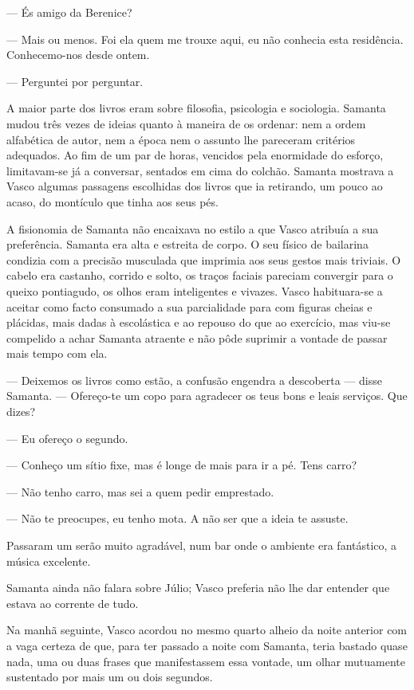--- És amigo da Berenice?

--- Mais ou menos. Foi ela quem me trouxe aqui, eu não conhecia esta
  residência. Conhecemo-nos desde ontem.

--- Perguntei por perguntar.

A maior parte dos livros eram sobre filosofia, psicologia e sociologia.
Samanta mudou três vezes de ideias quanto à maneira de os ordenar: nem
a ordem alfabética de autor, nem a época nem o assunto lhe pareceram
critérios adequados. Ao fim de um par de horas, vencidos pela enormidade
do esforço, limitavam-se já a conversar, sentados em cima do colchão.
Samanta mostrava a Vasco algumas passagens escolhidas dos livros que ia
retirando, um pouco ao acaso, do montículo que tinha aos seus pés.

A fisionomia de Samanta não encaixava no estilo a que Vasco atribuía a
sua preferência. Samanta era alta e estreita de corpo. O seu físico de
bailarina condizia com a precisão musculada que imprimia aos seus
gestos mais triviais. O cabelo era castanho, corrido e solto, os traços
faciais pareciam convergir para o queixo pontiagudo, os olhos eram
inteligentes e vivazes. Vasco habituara-se a aceitar como facto
consumado a sua parcialidade para com figuras cheias e plácidas, mais
dadas à escolástica e ao repouso do que ao exercício, mas viu-se compelido a achar Samanta atraente e não pôde suprimir a vontade de
passar mais tempo com ela.

--- Deixemos os livros como estão, a confusão engendra a descoberta ---
  disse Samanta. --- Ofereço-te um copo para agradecer os teus bons e
  leais serviços. Que dizes?


--- Eu ofereço o segundo.

--- Conheço um sítio fixe, mas é longe de mais para ir a pé. Tens carro?

--- Não tenho carro, mas sei a quem pedir emprestado.

--- Não te preocupes, eu tenho mota. A não ser que a ideia te assuste.


Passaram um serão muito agradável, num bar onde o ambiente era
fantástico, a música excelente.

Samanta ainda não falara sobre Júlio; Vasco preferia não lhe dar
entender que estava ao corrente de tudo.

Na manhã seguinte, Vasco acordou no mesmo quarto alheio da noite
anterior com a vaga certeza de que, para ter passado a noite com
Samanta, teria bastado quase nada, uma ou duas frases que manifestassem
essa vontade, um olhar mutuamente sustentado por mais um ou dois
segundos.

